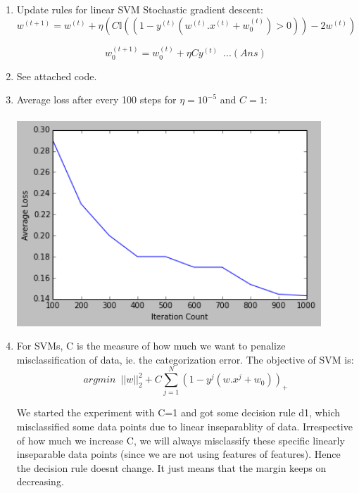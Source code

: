 \documentclass[letterpaper]{article}
\begin{document}
\begin{enumerate}

\item Update rules for linear SVM Stochastic gradient descent: 
\begin{equation}
w^{(t+1)} = w^{(t)} + \eta  (C  \mathbb{I}((1-y^{(t)}(w^{(t)}.x^{(t)} + w_0^{(t)}) > 0)) - 2w^{(t)})
\end{equation}

\begin{equation}
w_0^{(t+1)} = w_0^{(t)} + \eta  C  y^{(t)} \,\,\,  ...(Ans)
\end{equation}

\item See attached code.

\item Average loss after every 100 steps for $\eta = 10^{-5}$ and $C = 1$: \\ \\ 
\includegraphics[width = 4.5in, keepaspectratio]{HW3_figure6.png}

\item For SVMs, C is the measure of how much we want to penalize misclassification of data, ie. the categorization error. The objective of SVM is:
\begin{equation}
argmin \,\,\,  ||w||_2^2 + C\sum_{j=1}^N{(1-y^j(w.x^j + w_0))_{+}}
\end{equation}

We started the experiment with C=1 and got some decision rule d1, which misclassified some data points due to linear inseparablity of data. Irrespective of how much we increase C, we will always misclassify these specific linearly inseparable data points (since we are not using features of features). Hence the decision rule doesnt change. It just means that the margin keeps on decreasing.


\end{enumerate}
\end{document}
